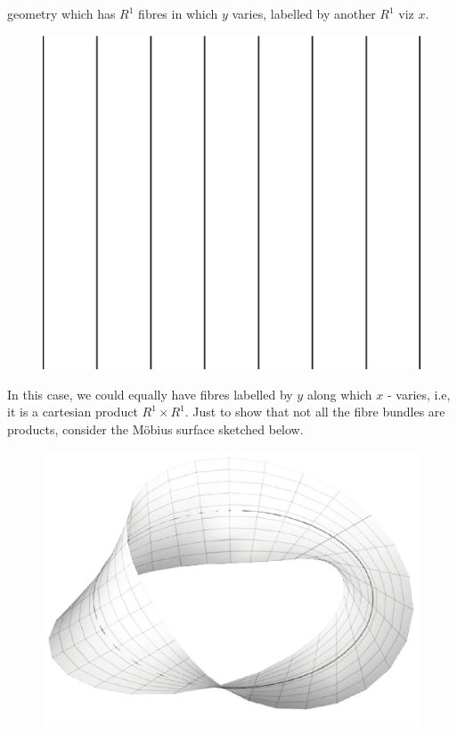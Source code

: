 geometry which has $R^1$ fibres in which $y$ varies, labelled by another $R^1$ viz $x$.
\begin{figure}[H]
\centering
\includegraphics[scale=0.1]{src/images/chap26/16.jpg}
\end{figure}

In this case, we could equally have fibres labelled by $y$ along which $x$ - varies,
i.e, it is a cartesian product $R^1 \times R^1$. Just to show that not all the fibre bundles
are products, consider the M\"{o}bius surface sketched below.
\begin{figure}[H]
\centering
\includegraphics[scale=0.25]{src/images/chap26/17.jpg}
\end{figure}

